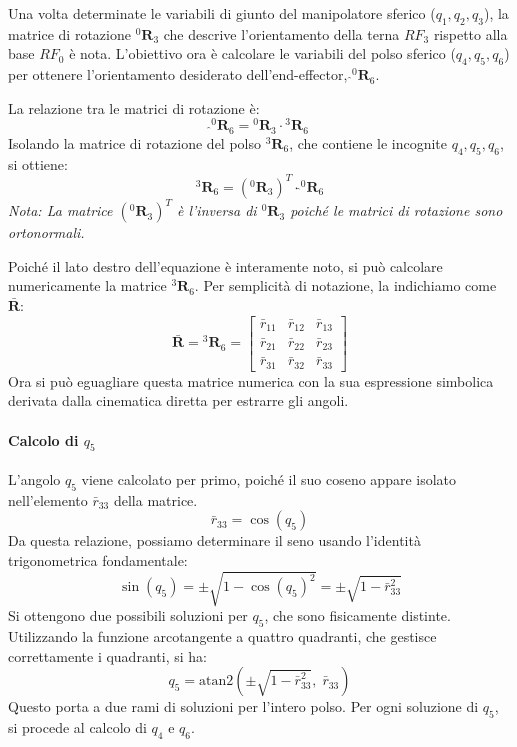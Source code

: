 \documentclass[11pt, a4paper]{report}
\begin{document}
Una volta determinate le variabili di giunto del manipolatore sferico ($q_1, q_2, q_3$), la matrice di rotazione ${}^{0}\mathbf{R}_{3}$ che descrive l'orientamento della terna \(RF_{3}\) rispetto alla base \(RF_{0}\) è nota. L'obiettivo ora è calcolare le variabili del polso sferico ($q_4, q_5, q_6$) per ottenere l'orientamento desiderato dell'end-effector, $\hat{}^{0}\mathbf{R}_{6}$.

La relazione tra le matrici di rotazione è:
\[
    \hat{}^{0}\mathbf{R}_{6} = {}^{0}\mathbf{R}_{3} \cdot {}^{3}\mathbf{R}_{6}
\]
Isolando la matrice di rotazione del polso ${}^{3}\mathbf{R}_{6}$, che contiene le incognite $q_4, q_5, q_6$, si ottiene:
\[
    {}^{3}\mathbf{R}_{6} = ({}^{0}\mathbf{R}_{3})^{T} \cdot \hat{}^{0}\mathbf{R}_{6}
\]
\textit{Nota: La matrice $({}^{0}\mathbf{R}_{3})^{T}$ è l'inversa di ${}^{0}\mathbf{R}_{3}$ poiché le matrici di rotazione sono ortonormali.}

Poiché il lato destro dell'equazione è interamente noto, si può calcolare numericamente la matrice ${}^{3}\mathbf{R}_{6}$. Per semplicità di notazione, la indichiamo come $\bar{\mathbf{R}}$:
\[
    \bar{\mathbf{R}} = {}^{3}\mathbf{R}_{6} =
    \begin{bmatrix}
        \bar{r}_{11} & \bar{r}_{12} & \bar{r}_{13} \\
        \bar{r}_{21} & \bar{r}_{22} & \bar{r}_{23} \\
        \bar{r}_{31} & \bar{r}_{32} & \bar{r}_{33}
    \end{bmatrix}
\]
Ora si può eguagliare questa matrice numerica con la sua espressione simbolica derivata dalla cinematica diretta per estrarre gli angoli.

\paragraph{Calcolo di \(q_5\)}
L'angolo $q_5$ viene calcolato per primo, poiché il suo coseno appare isolato nell'elemento $\bar{r}_{33}$ della matrice.
\[
    \bar{r}_{33} = \cos(q_5)
\]
Da questa relazione, possiamo determinare il seno usando l'identità trigonometrica fondamentale:
\[
    \sin(q_5) = \pm \sqrt{1 - \cos(q_5)^2} = \pm \sqrt{1 - \bar{r}_{33}^2}
\]
Si ottengono due possibili soluzioni per $q_5$, che sono fisicamente distinte. Utilizzando la funzione arcotangente a quattro quadranti, che gestisce correttamente i quadranti, si ha:
\begin{equation}
    \boxed{q_{5} = \text{atan2}(\pm \sqrt{1 - \bar{r}_{33}^2}, \; \bar{r}_{33})}
\end{equation}
Questo porta a due rami di soluzioni per l'intero polso. Per ogni soluzione di $q_5$, si procede al calcolo di $q_4$ e $q_6$.
\end{document}
